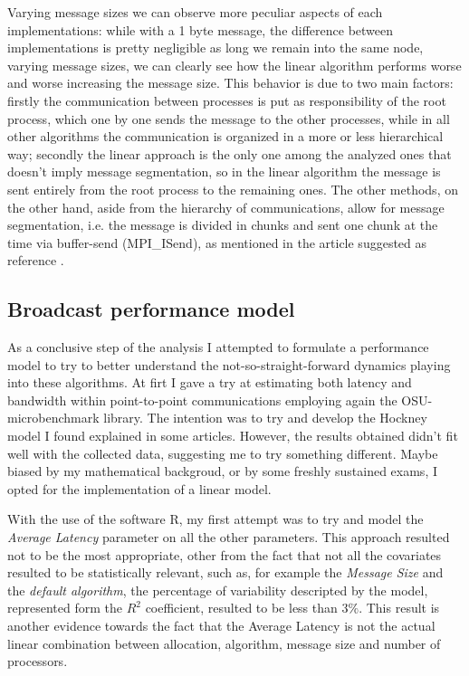 \documentclass{article}
\begin{document}
	Varying message sizes we can observe more peculiar aspects of each implementations: while with a 1 byte message, the difference between implementations is pretty negligible as long we remain into the same node, varying message sizes, we can clearly see how the linear algorithm performs worse and worse increasing the message size.
	This behavior is due to two main factors: firstly the communication between processes is put as responsibility of the root process, which one by one sends the message to the other processes, while in all other algorithms the communication is organized in a more or less hierarchical way; secondly the linear approach is the only one among the analyzed ones that doesn't imply message segmentation, so in the linear algorithm the message is sent entirely from the root process to the remaining ones. The other methods, on the other hand, aside from the hierarchy of communications, allow for message segmentation, i.e. the message is divided in chunks and sent one chunk at the time via buffer-send (MPI\_ISend), as mentioned in the article suggested as reference \cite{bcast_article}.
	
	\subsection{Broadcast performance model}
	As a conclusive step of the analysis I attempted to formulate a performance model to try to better understand the not-so-straight-forward dynamics playing into these algorithms. 
	At firt I gave a try at estimating both latency and bandwidth within point-to-point communications employing again the OSU-microbenchmark library. The intention was to try and develop the Hockney model I found explained in some articles. However, the results obtained didn't fit well with the collected data, suggesting me to try something different. Maybe biased by my mathematical backgroud, or by some freshly sustained exams, I opted for the implementation of a linear model.
	
	With the use of the software R, my first attempt was to try and model the \textit{Average Latency} parameter on all the other parameters. This approach resulted not to be the most appropriate, other from the fact that not all the covariates resulted to be statistically relevant, such as, for example the \textit{Message Size} and the \textit{default algorithm}, the percentage of variability descripted by the model, represented form the $R^2$ coefficient, resulted to be less than $3\%$.
	This result is another evidence towards the fact that the Average Latency is not the actual linear combination between allocation, algorithm, message size and number of processors.
	
\end{document}
